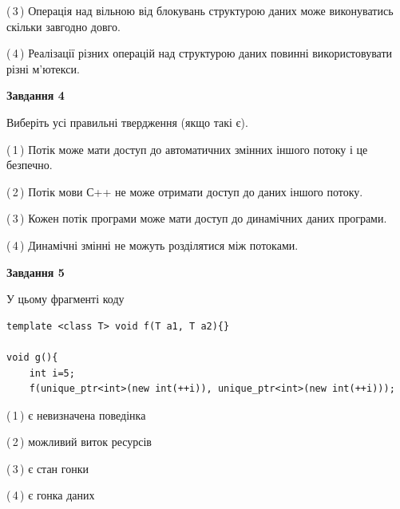 \documentclass[12pt, ukrainian]{article}
\begin{document}
\begin {large}
{(\,3\,) Операція над вільною від блокувань структурою даних може виконуватись скільки завгодно довго.%

(\,4\,) Реалізації різних операцій над структурою даних повинні використовувати різні м’ютекси.%



\begin{center}
\textbf{Завдання 4}
\end{center}
Виберіть усі правильні твердження (якщо такі є).\par
\vspace{2mm}

(\,1\,) Потік може мати доступ до автоматичних змінних іншого потоку і це безпечно.%

(\,2\,) Потік мови С++ не може отримати доступ до даних іншого потоку.%

(\,3\,) Кожен потік програми може мати доступ до динамічних даних програми.%

(\,4\,) Динамічні змінні не можуть розділятися між потоками.%



\begin{center}
\textbf{Завдання 5}
\end{center}
У цьому фрагменті коду
\begin{verbatim}
template <class T> void f(T a1, T a2){}

void g(){
    int i=5;
    f(unique_ptr<int>(new int(++i)), unique_ptr<int>(new int(++i)));
\end{verbatim}

(\,1\,) є невизначена поведінка%

(\,2\,) можливий виток ресурсів%

(\,3\,) є стан гонки%

(\,4\,) є гонка даних%


}
\end {large}
\end{document}
